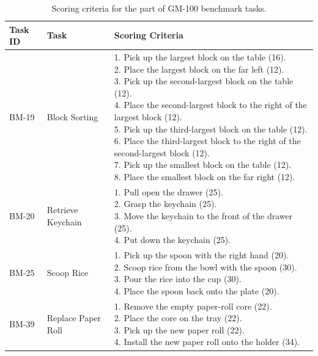 \begin{table}[ht!]
\centering
\scriptsize
\setlength{\tabcolsep}{3pt}
\renewcommand{\arraystretch}{1.1}
\caption{Scoring criteria for the part of GM-100 benchmark tasks.}
\label{tab:bm_scoring}
\begin{tabular}{p{} p{} p{}}
\toprule
\textbf{Task ID} & \textbf{Task} & \textbf{Scoring Criteria} \\
\midrule

BM-19 & Block Sorting &
\makecell[l]{
1. Pick up the largest block on the table (16). \\
2. Place the largest block on the far left (12). \\
3. Pick up the second-largest block on the table (12). \\
4. Place the second-largest block to the right of the largest block (12). \\
5. Pick up the third-largest block on the table (12). \\
6. Place the third-largest block to the right of the second-largest block (12). \\
7. Pick up the smallest block on the table (12). \\
8. Place the smallest block on the far right (12).
} \\
\midrule

BM-20 & Retrieve Keychain &
\makecell[l]{
1. Pull open the drawer (25). \\
2. Grasp the keychain (25). \\
3. Move the keychain to the front of the drawer (25). \\
4. Put down the keychain (25).
} \\
\midrule

BM-25 & Scoop Rice &
\makecell[l]{
1. Pick up the spoon with the right hand (20). \\
2. Scoop rice from the bowl with the spoon (30). \\
3. Pour the rice into the cup (30). \\
4. Place the spoon back onto the plate (20).
} \\
\midrule

BM-39 & Replace Paper Roll &
\makecell[l]{
1. Remove the empty paper-roll core (22). \\
2. Place the core on the tray (22). \\
3. Pick up the new paper roll (22). \\
4. Install the new paper roll onto the holder (34).
} \\
\midrule


\end{tabular}
\end{table}
